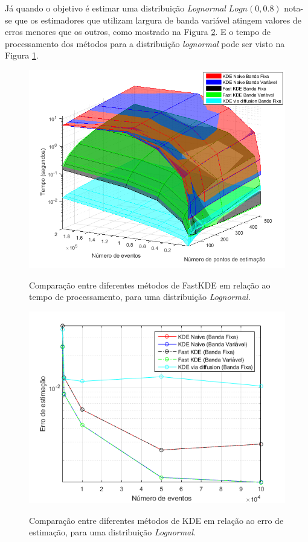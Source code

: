 Já quando o objetivo é estimar uma distribuição \textit{Lognormal} $Logn(0,0.8)$ nota-se que os estimadores que utilizam largura de banda variável atingem valores de erros menores que os outros, como mostrado na Figura \ref{fig:erroKDElog}. E o tempo de processamento dos métodos para a distribuição \textit{lognormal} pode ser visto na Figura \ref{fig:compKDElog}.

\begin{figure}[!ht]
	\centering
	\includegraphics[width=12cm]{./textuais/desenvolvimento/figuras/compKDElog.png}\\
	\caption{Comparação entre diferentes métodos de FastKDE em relação ao tempo de processamento, para uma distribuição \textit{Lognormal}.}
	\label{fig:compKDElog}
\end{figure}

\begin{figure}[!ht]
	\centering
	\includegraphics[width=12cm]{./textuais/desenvolvimento/figuras/erroKDElog.png}\\
	\caption{Comparação entre diferentes métodos de KDE em relação ao erro de estimação, para uma distribuição \textit{Lognormal}.}
	\label{fig:erroKDElog}
\end{figure}

